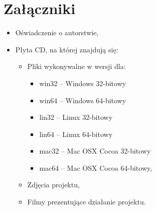 \section{Załączniki}
\begin{itemize}
\item Oświadczenie o autorstwie,
\item Płyta CD, na której znajdują się:
\begin{itemize}
\item Pliki wykonywalne w wersji dla:
\begin{itemize}
\item win32 -- Windows 32-bitowy
\item win64 -- Windows 64-bitowy 
\item lin32 -- Linux 32-bitowy
\item lin64 -- Linux 64-bitowy
\item mac32 -- Mac OSX Cocoa 32-bitowy
\item mac64 -- Mac OSX Cocoa 64-bitowy,
\end{itemize}
\item Zdjęcia projektu,
\item Filmy prezentujące działanie projektu.
\end{itemize}
\end{itemize}
